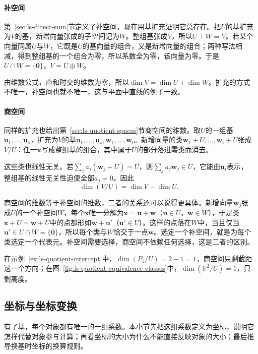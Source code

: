 \paragraph{补空间}
第~\ref{sec:ls-direct-sum}节定义了补空间，现在用基扩充证明它总存在。把$U$的基扩充为$V$的基，新增向量张成的子空间记为$W$。整组基张成$V$，所以$U+W=V$。若某个向量同属$U$与$W$，它既是$U$的基向量的组合，又是新增向量的组合；两种写法相减，得到整组基的一个组合为零，所以系数全为零，该向量为零。于是$U\cap W=\{\bm0\}$，$V=U\oplus W$。

由维数公式，直和时交的维数为零，所以$\dim V=\dim U+\dim W$。扩充的方式不唯一，补空间也就不唯一，这与平面中直线的例子一致。

\paragraph{商空间}
同样的扩充也给出第~\ref{sec:ls-quotient-spaces}节商空间的维数。取$U$的一组基$\bm u_1,\ldots,\bm u_s$，扩充为$V$的基$\bm u_1,\ldots,\bm u_s,\bm w_1,\ldots,\bm w_t$。新增向量的类$\bm w_1+U,\ldots,\bm w_t+U$张成$V/U$：任一$\bm x$写成整组基的组合，其中属于$U$的部分落进零类而消去。

这些类也线性无关。若$\sum_ja_j(\bm w_j+U)=U$，则$\sum_ja_j\bm w_j\in U$，它能由$\bm u_i$表示，整组基的线性无关性迫使全部$a_j=0$。因此
\begin{equation}
 \dim(V/U)=\dim V-\dim U.
 \label{eq:ls-quotient-dimension}
\end{equation}

商空间的维数等于补空间的维数，二者的关系还可以说得更具体。新增向量$\bm w_j$张成$U$的一个补空间$W$，每个$\bm x$唯一分解为$\bm x=\bm u+\bm w$（$\bm u\in U$，$\bm w\in W$），于是类$\bm x+U=\bm w+U$中的点都形如$\bm w+\bm u'$（$\bm u'\in U$）。这样的点落在$W$中，当且仅当$\bm u'\in U\cap W=\{\bm0\}$，所以每个类与$W$恰交于一点$\bm w$。选定一个补空间，就是为每个类选定一个代表元。补空间需要选择，商空间不依赖任何选择，这是二者的区别。

在示例~\ref{ex:ls-quotient-intercept}中，$\dim(P_1/U)=2-1=1$，商空间只剩截距这一个方向；在图~\ref{fig:ls-quotient-equivalence-classes}中，$\dim(\mathbb R^2/U)=1$，只剩高度。

\subsection{坐标与坐标变换}
\label{sec:ls-coordinates}
\label{sec:linear-algebra-coordinates}

有了基，每个对象都有唯一的一组系数。本小节先把这组系数定义为坐标，说明它怎样代替对象参与计算；再看坐标的大小为什么不能直接反映对象的大小；最后推导换基时坐标的换算规则。

